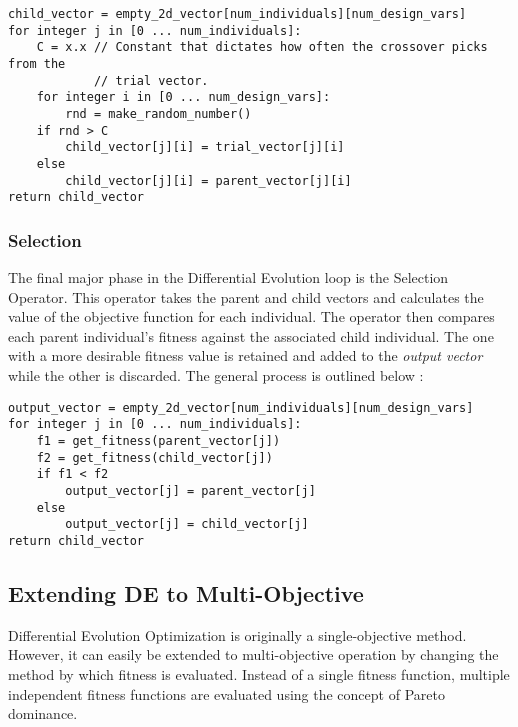 \begin{lstlisting}[caption=Pseudocode for the Crossover Operator \cite{diff-evol},captionpos=b]
child_vector = empty_2d_vector[num_individuals][num_design_vars]
for integer j in [0 ... num_individuals]:
    C = x.x // Constant that dictates how often the crossover picks from the
            // trial vector. 
    for integer i in [0 ... num_design_vars]:
        rnd = make_random_number()
	if rnd > C
	    child_vector[j][i] = trial_vector[j][i]
	else
	    child_vector[j][i] = parent_vector[j][i]
return child_vector
\end{lstlisting}

\subsubsection{Selection}
The final major phase in the Differential Evolution loop is the Selection Operator. This operator takes the parent and child vectors and calculates the value of the objective function for each individual. The operator then compares each parent individual's fitness against the associated child individual. The one with a more desirable fitness value is retained and added to the \emph{output vector} while the other is discarded. The general process is outlined below \cite{diff-evol}:

\begin{lstlisting}[label=lst:sel,caption=Pseudocode for the Selection Operator (Assuming a minimization approach) \cite{diff-evol},captionpos=b]
output_vector = empty_2d_vector[num_individuals][num_design_vars]
for integer j in [0 ... num_individuals]:
    f1 = get_fitness(parent_vector[j])
    f2 = get_fitness(child_vector[j])
    if f1 < f2
        output_vector[j] = parent_vector[j]
    else
        output_vector[j] = child_vector[j]
return child_vector
\end{lstlisting}

\subsection{Extending DE to Multi-Objective}
Differential Evolution Optimization is originally a single-objective method. However, it can easily be extended to multi-objective operation by changing the method by which fitness is evaluated. Instead of a single fitness function, multiple independent fitness functions are evaluated using the concept of Pareto dominance. 


